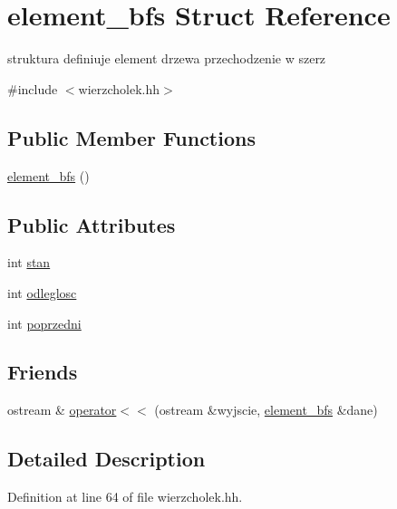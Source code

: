 \hypertarget{structelement__bfs}{\section{element\-\_\-bfs \-Struct \-Reference}
\label{structelement__bfs}
}


struktura definiuje element drzewa przechodzenie w szerz  




{\ttfamily \#include $<$wierzcholek.\-hh$>$}

\subsection*{\-Public \-Member \-Functions}
\begin{DoxyCompactItemize}
\item 
\hyperlink{structelement__bfs_a9c764ce268e74260e6634ea98ed13781}{element\-\_\-bfs} ()
\end{DoxyCompactItemize}
\subsection*{\-Public \-Attributes}
\begin{DoxyCompactItemize}
\item 
int \hyperlink{structelement__bfs_aa654df64808f513f41d0349571e4b90e}{stan}
\item 
int \hyperlink{structelement__bfs_a91fcdfed5d5dc2bce6ca9bb4414df196}{odleglosc}
\item 
int \hyperlink{structelement__bfs_a94b882f6922be485d6942f71c29e581d}{poprzedni}
\end{DoxyCompactItemize}
\subsection*{\-Friends}
\begin{DoxyCompactItemize}
\item 
ostream \& \hyperlink{structelement__bfs_a8b076b347dc8398fd7e704d74299eb3a}{operator$<$$<$} (ostream \&wyjscie, \hyperlink{structelement__bfs}{element\-\_\-bfs} \&dane)
\end{DoxyCompactItemize}


\subsection{\-Detailed \-Description}


\-Definition at line 64 of file wierzcholek.\-hh.



